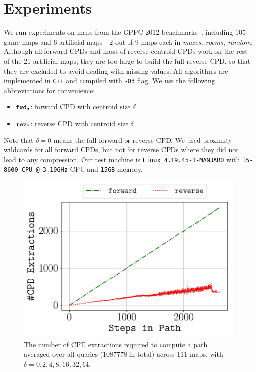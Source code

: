\section{Experiments}
\label{sec:results}
We run experiments on maps from the GPPC 2012 benchmarks~\cite{sturtevant2012benchmarks},
including 105 game maps and 6 artificial maps - 2 out of 9 maps each in \textit{mazes, rooms, random}.
Although all forward CPDs and most of reverse-centroid CPDs work on the rest of the 21 artificial maps, 
they are too large to build the full reverse CPD, so that they are excluded to avoid dealing with 
missing values.
All algorithms are implemented in {\tt C++} and compiled with {\tt -O3} flag.
We use the following abbreviations for convenience:
\begin{itemize}
    \item $\tt fwd_\delta$: forward CPD with centroid size $\delta$ 
    \item $\tt rev_\delta$: reverse CPD with centroid size $\delta$
\end{itemize}
Note that $\delta = 0$ means the full forward or reverse CPD.
We used proximity wildcards for all forward CPDs, but not for reverse CPDs where they did not lead to any compression.
Our test machine is {\tt \small Linux 4.19.45-1-MANJARO} with {\small \tt i5-8600 CPU @ 3.10GHz} CPU and {\tt 15GB} memory.

\begin{figure}
    \centering
    \includegraphics[width=\columnwidth]{pic/steps-access.pdf}
    \caption{ 
    The number of CPD extractions required to compute a path averaged over 
    all queries (1087778 in total) across 111 maps, with $\delta=0,2,4,8,16,32,64$.}
    \label{fig:access}
\end{figure}


